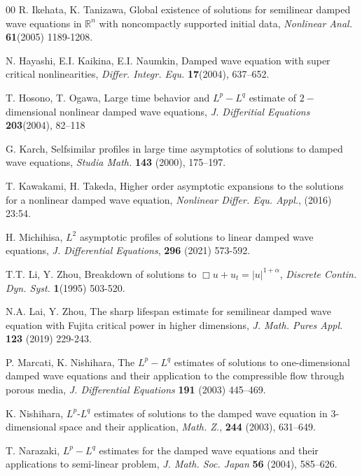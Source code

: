 \documentclass[11pt,reqno]{amsart}
\begin{document}
\begin{thebibliography}{00}
 R. Ikehata, K. Tanizawa, Global existence of solutions for semilinear damped
wave equations in $\mathbb{R}^n$ with noncompactly supported
initial data, \textit{Nonlinear Anal.} \textbf{61}(2005) 1189-1208.

 N. Hayashi,  E.I. Kaikina,  E.I. Naumkin, Damped wave equation with super
critical nonlinearities, \textit{Differ. Integr. Equ. } \textbf{17}(2004), 637–652.

 T. Hosono, T. Ogawa, Large time behavior and $L^p-L^q$ estimate of $2-$
dimensional nonlinear damped wave equations, \textit{J. Differitial Equations } \textbf{203}(2004), 82–118

 G. Karch,  Selfsimilar profiles in large time asymptotics of solutions to damped wave equations, \textit{Studia
Math. }\textbf{143} (2000), 175–197.

 T. Kawakami, H. Takeda, Higher order asymptotic expansions to the solutions for a nonlinear damped wave equation, \textit{Nonlinear Differ. Equ. Appl.}, (2016) 23:54. 

 H. Michihisa, $L^2$ asymptotic profiles of solutions to linear damped wave equations, \textit{J. Differential Equations}, \textbf{296} (2021) 573-592.

 T.T. Li, Y. Zhou,  Breakdown of solutions to $\Box u + u_t = |u|^{1+\alpha}$, \textit{Discrete
Contin. Dyn. Syst. } \textbf{1}(1995) 503-520.

 N.A. Lai, Y. Zhou, The sharp lifespan estimate for semilinear damped wave equation with Fujita critical power in higher dimensions, \textit{J. Math. Pures Appl.} \textbf{123}      (2019) 229-243.



 P. Marcati, K. Nishihara, The $L^p-L^q$ estimates of solutions to one-dimensional damped wave equations and their application to the compressible flow
through porous media, \textit{J. Differential Equations} \textbf{191}        (2003) 445–469.


 K. Nishihara, $L^p$-$L^q$ estimates of solutions to the damped wave equation in 3-dimensional space and their application, \textit{Math. Z.}, \textbf{244} (2003), 631--649.


 T. Narazaki, $L^p-L^q$ estimates for the damped wave equations and their applications to semi-linear problem, \textit{ J. Math. Soc. Japan } \textbf{56}       (2004), 585–626.


\end{thebibliography}
\end{document}
